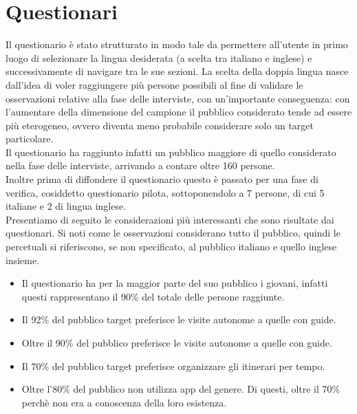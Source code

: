 \section{Questionari}

Il questionario è stato strutturato in modo tale da permettere all'utente in primo luogo di selezionare la lingua desiderata (a scelta tra italiano e inglese) e successivamente di navigare tra le sue sezioni. La scelta della doppia lingua nasce dall'idea di voler 
raggiungere più persone possibili al fine di validare le osservazioni relative alla fase delle interviste, con un'importante conseguenza: con l'aumentare della dimensione del campione il pubblico considerato tende ad essere più eterogeneo, ovvero diventa meno probabile considerare solo un target particolare. \\

Il questionario ha raggiunto infatti un pubblico maggiore di quello considerato nella fase delle interviste, arrivando a contare oltre 160 persone. \\

Inoltre prima di diffondere il questionario questo è passato per una fase di verifica, cosiddetto questionario pilota, sottoponendolo a 7 persone, di cui 5 italiane e 2 di lingua inglese.\\

Presentiamo di seguito le considerazioni più interessanti che sono risultate dai questionari. Si noti come le osservazioni considerano tutto il pubblico, quindi le percetuali si riferiscono, se non specificato, al pubblico italiano e quello inglese insieme.

\begin{itemize}

\item Il questionario ha per la maggior parte del suo pubblico i giovani, infatti questi rappresentano il 90\% del totale delle persone raggiunte.

\item Il 92\% del pubblico target preferisce le visite autonome a quelle con guide.

\item Oltre il 90\% del pubblico preferisce le visite autonome a quelle con guide.

\item Il 70\% del pubblico target preferisce organizzare gli itinerari per tempo.

\item Oltre l'80\% del pubblico non utilizza app del genere. Di questi, oltre il 70\% perchè non era a conoscenza della loro esistenza.

\end{itemize}